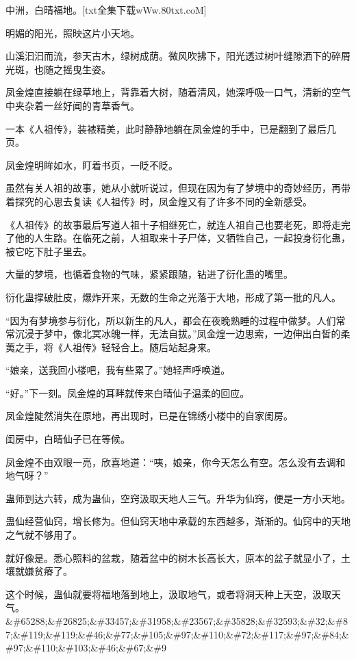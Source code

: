 
\begin{this_body}

中洲，白晴福地。[txt全集下载wWw.80txt.coM]

明媚的阳光，照映这片小天地。

山溪汩汩而流，参天古木，绿树成荫。微风吹拂下，阳光透过树叶缝隙洒下的碎屑光斑，也随之摇曳生姿。

凤金煌直接躺在绿草地上，背靠着大树，随着清风，她深呼吸一口气，清新的空气中夹杂着一丝好闻的青草香气。

一本《人祖传》，装裱精美，此时静静地躺在凤金煌的手中，已是翻到了最后几页。

凤金煌明眸如水，盯着书页，一眨不眨。

虽然有关人祖的故事，她从小就听说过，但现在因为有了梦境中的奇妙经历，再带着探究的心思去复读《人祖传》时，凤金煌又有了许多不同的全新感受。

《人祖传》的故事最后写道人祖十子相继死亡，就连人祖自己也要老死，即将走完了他的人生路。在临死之前，人祖取来十子尸体，又牺牲自己，一起投身衍化蛊，被它吃下肚子里去。

大量的梦境，也循着食物的气味，紧紧跟随，钻进了衍化蛊的嘴里。

衍化蛊撑破肚皮，爆炸开来，无数的生命之光落于大地，形成了第一批的凡人。

“因为有梦境参与衍化，所以新生的凡人，都会在夜晚熟睡的过程中做梦。人们常常沉浸于梦中，像北冥冰魄一样，无法自拔。”凤金煌一边思索，一边伸出白皙的柔荑之手，将《人祖传》轻轻合上。随后站起身来。

“娘亲，送我回小楼吧，我有些累了。”她轻声呼唤道。

“好。”下一刻。凤金煌的耳畔就传来白晴仙子温柔的回应。

凤金煌陡然消失在原地，再出现时，已是在锦绣小楼中的自家闺房。

闺房中，白晴仙子已在等候。

凤金煌不由双眼一亮，欣喜地道：“咦，娘亲，你今天怎么有空。怎么没有去调和地气呀？”

蛊师到达六转，成为蛊仙，空窍汲取天地人三气。升华为仙窍，便是一方小天地。

蛊仙经营仙窍，增长修为。但仙窍天地中承载的东西越多，渐渐的。仙窍中的天地之气就不够用了。

就好像是。悉心照料的盆栽，随着盆中的树木长高长大，原本的盆子就显小了，土壤就嫌贫瘠了。

这个时候，蛊仙就要将福地落到地上，汲取地气，或者将洞天种上天空，汲取天气。\&\#65288;\&\#26825;\&\#33457;\&\#31958;\&\#23567;\&\#35828;\&\#32593;\&\#32;\&\#87;\&\#119;\&\#119;\&\#46;\&\#77;\&\#105;\&\#97;\&\#110;\&\#72;\&\#117;\&\#97;\&\#84;\&\#97;\&\#110;\&\#103;\&\#46;\&\#67;\&\#9


\end{this_body}
